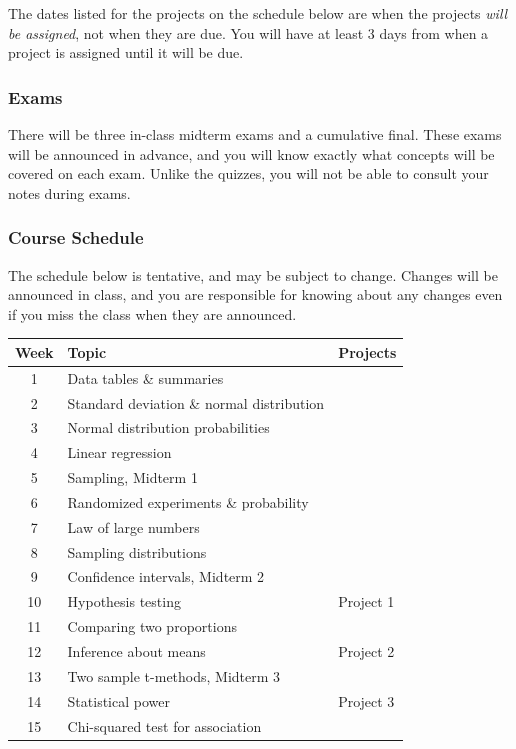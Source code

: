 \documentclass[10pt]{article}
\begin{document}
The dates listed for the projects on the schedule below are when the projects \emph{will be assigned}, not when they are due.  You will have at least 3 days from when a project is assigned until it will be due.  

\subsubsection*{Exams}

There will be three in-class midterm exams and a cumulative final. These exams will be announced in advance, and you will know exactly what concepts will be covered on each exam.  Unlike the quizzes, you will not be able to consult your notes during exams. 

\subsubsection*{Course Schedule} 

The schedule below is tentative, and may be subject to change. Changes will be announced in class, and you are responsible for knowing about any changes even if you miss the class when they are announced. 

\begin{center}
\begin{tabular}{|c|l|l|}
\hline
Week  & Topic & Projects \\ \hline
1  & Data tables \& summaries  &  \\
2  & Standard deviation \& normal distribution  &  \\
3  & Normal distribution probabilities  &  \\
4  & Linear regression  &  \\
5  & Sampling, Midterm 1  &  \\
6  & Randomized experiments \& probability  &  \\
7  & Law of large numbers  &  \\
8  & Sampling distributions  &  \\
9  & Confidence intervals, Midterm 2  &  \\
10  & Hypothesis testing  & Project 1 \\
11  & Comparing two proportions  &  \\
12  & Inference about means  & Project 2 \\
13  & Two sample t-methods, Midterm 3  & \\
14  & Statistical power  & Project 3  \\ 
15  & Chi-squared test for association  &  \\ \hline
\end{tabular}
\end{center}
\end{document}
